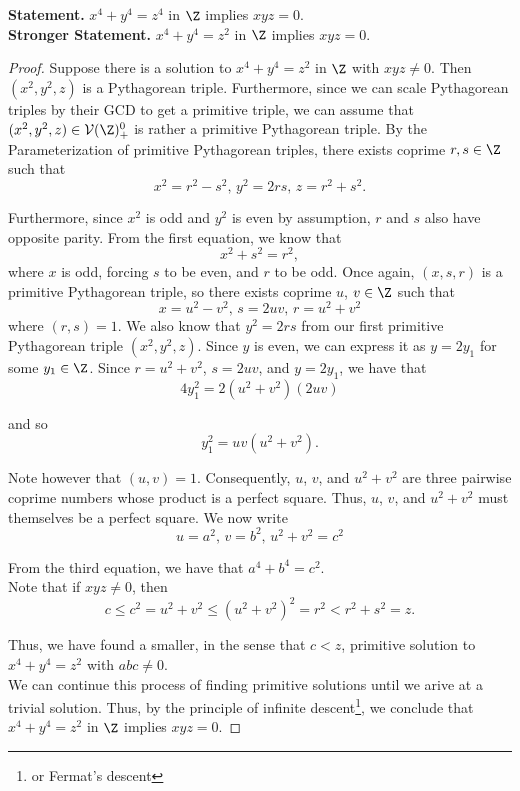\documentclass[11pt]{article}
\begin{document}
\textbf{Statement.} $x^4 + y^4 = z^4$ in $\Z$ implies $xyz = 0$. \\
\textbf{Stronger Statement.} $x^4 + y^4 = z^2$ in $\Z$ implies $xyz = 0$.
\begin{proof}
Suppose there is a solution to $x^4 + y^4 = z^2$ in $\Z$ with $xyz \neq 0$. Then $(x^2, y^2, z)$ is a Pythagorean triple. Furthermore, since we can scale Pythagorean triples by their GCD to get a primitive triple, we can assume that 
$(x^2, y^2, z) \in \mathcal{V}(\Z)_+^0$ is rather a primitive Pythagorean triple. By the Parameterization
of primitive Pythagorean triples, there exists coprime $r, s \in \Z$ such that 
\[
  x^2 = r^2 - s^2, \, y^2 = 2rs, \, z = r^2 + s^2.  
\]

Furthermore, since $x^2$ is odd and $y^2$ is even by assumption, $r$ and $s$ also have opposite parity. From the first equation, we know that 
\[
    x^2 + s^2 = r^2,
\] where $x$ is odd, forcing $s$ to be even, and $r$ to be odd. Once again, $(x, s, r)$ is a primitive Pythagorean triple, so there exists coprime $u$, $v \in \Z$ such that
\[ 
    x = u^2 - v^2, \, s = 2uv, \, r = u^2 + v^2 
\]
where $(r, s) = 1$. We also know that $y^2 = 2rs$ from our first primitive Pythagorean triple $(x^2, y^2, z)$. Since $y$ is even, we can express it as $y=2y_1$ for some $y_1 \in \Z$. 
Since $r = u^2 + v^2$, $s = 2uv$, and $y=2y_1$, we have that
\[
    4y_1^2 = 2(u^2 + v^2)(2uv)
\]
    
and so 
\[
    y_1^2 = uv(u^2 + v^2).    
\]

Note however that $(u, v) = 1$. Consequently, $u$, $v$, and $u^2 + v^2$ are three pairwise coprime numbers whose product is a perfect square. Thus, $u$, $v$, and $u^2 + v^2$ must themselves be a perfect square.
We now write 
\[
    u = a^2, \, v = b^2, \, u^2 + v^2 = c^2
\]

From the third equation, we have that $a^4 + b^4 = c^2$. \\

Note that if $xyz \neq 0$, then
\[ c \leq c^2 = u^2 + v^2 \leq (u^2 + v^2)^2 = r^2 < r^2 + s^2 = z. \]

Thus, we have found a smaller, in the sense that $c < z$, primitive solution to $x^4 + y^4 = z^2$ with $abc \neq 0$. \\

We can continue this process of finding primitive solutions until we arive at a trivial solution. Thus, by the principle of infinite descent\footnote{or Fermat's descent}, we conclude
that $x^4 + y^4 = z^2$ in $\Z$ implies $xyz = 0$. \end{proof}
\end{document}
